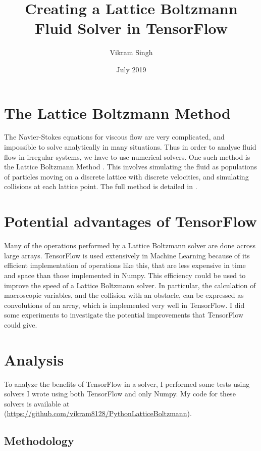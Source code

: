 \documentclass{article}
\title{\Huge Creating a Lattice Boltzmann Fluid Solver in TensorFlow}
\author{Vikram Singh}
\date{July 2019}
\begin{document}
\maketitle

\section{The Lattice Boltzmann Method}

The Navier-Stokes equations for viscous flow are very complicated, and impossible to solve analytically in many situations. Thus in order to analyse fluid flow in irregular systems, we have to use numerical solvers. One such method is the Lattice Boltzmann Method \cite{wikiLB}. This involves simulating the fluid as populations of particles moving on a discrete lattice with discrete velocities, and simulating collisions at each lattice point. The full method is detailed in \cite{LBBook}.

\section{Potential advantages of TensorFlow}

Many of the operations performed by a Lattice Boltzmann solver are done across large arrays. TensorFlow is used extensively in Machine Learning because of its efficient implementation of operations like this, that are less expensive in time and space than those implemented in Numpy. This efficiency could be used to improve the speed of a Lattice Boltzmann solver. In particular, the calculation of macroscopic variables, and the collision with an obstacle, can be expressed as convolutions of an array, which is implemented very well in TensorFlow. I did some experiments to investigate the potential improvements that TensorFlow could give.

\section{Analysis}

To analyze the benefits of TensorFlow in a solver, I performed some tests using solvers I wrote using both TensorFlow and only Numpy. My code for these solvers is available at (\url{https://github.com/vikram8128/PythonLatticeBoltzmann}).



\subsection{Methodology}
\end{document}
